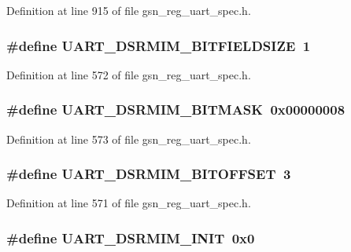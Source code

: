 Definition at line 915 of file gsn\_\-reg\_\-uart\_\-spec.h.

\hypertarget{a00575_aecc4b90c73282d0642debe10cf6d6183}{
\subsubsection[{UART\_\-DSRMIM\_\-BITFIELDSIZE}]{\setlength{\rightskip}{0pt plus 5cm}\#define UART\_\-DSRMIM\_\-BITFIELDSIZE~1}}
\label{a00575_aecc4b90c73282d0642debe10cf6d6183}


Definition at line 572 of file gsn\_\-reg\_\-uart\_\-spec.h.

\hypertarget{a00575_ab9062f3bd17bfc23e77f3155c186c257}{
\subsubsection[{UART\_\-DSRMIM\_\-BITMASK}]{\setlength{\rightskip}{0pt plus 5cm}\#define UART\_\-DSRMIM\_\-BITMASK~0x00000008}}
\label{a00575_ab9062f3bd17bfc23e77f3155c186c257}


Definition at line 573 of file gsn\_\-reg\_\-uart\_\-spec.h.

\hypertarget{a00575_a4c32e89a66faa5450857f98a2054df8b}{
\subsubsection[{UART\_\-DSRMIM\_\-BITOFFSET}]{\setlength{\rightskip}{0pt plus 5cm}\#define UART\_\-DSRMIM\_\-BITOFFSET~3}}
\label{a00575_a4c32e89a66faa5450857f98a2054df8b}


Definition at line 571 of file gsn\_\-reg\_\-uart\_\-spec.h.

\hypertarget{a00575_a72b9f2dd8f68150f29ca22529bb5bf76}{
\subsubsection[{UART\_\-DSRMIM\_\-INIT}]{\setlength{\rightskip}{0pt plus 5cm}\#define UART\_\-DSRMIM\_\-INIT~0x0}}
\label{a00575_a72b9f2dd8f68150f29ca22529bb5bf76}


